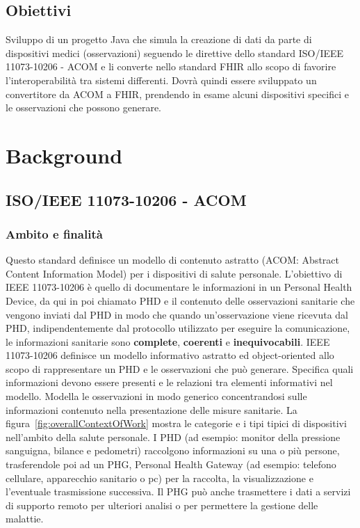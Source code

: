 \documentclass[a4paper]{article}
\begin{document}
\subsection{Obiettivi}
Sviluppo di un progetto Java che simula la creazione di dati da parte di dispositivi medici (osservazioni) seguendo le direttive dello standard ISO/IEEE 11073-10206 - ACOM e li converte nello
standard FHIR allo scopo di favorire l'interoperabilità tra sistemi differenti.
Dovrà quindi essere sviluppato un convertitore da ACOM a FHIR, prendendo in esame alcuni dispositivi specifici e le osservazioni che possono generare. 
\section{Background}
\subsection{ISO/IEEE 11073-10206 - ACOM}
\subsubsection{Ambito e finalità}
Questo standard definisce un modello di contenuto astratto (ACOM: Abstract Content Information Model) per i dispositivi di salute personale.
L'obiettivo di IEEE 11073-10206 è quello di documentare le informazioni in un Personal Health Device, da qui in poi chiamato PHD e il contenuto delle osservazioni sanitarie che vengono inviati dal PHD in modo che quando un'osservazione viene ricevuta dal PHD, indipendentemente dal protocollo utilizzato per eseguire
la comunicazione, le informazioni sanitarie sono \textbf{complete}, \textbf{coerenti} e \textbf{inequivocabili}.
IEEE 11073-10206 definisce un modello informativo astratto ed object-oriented allo scopo di rappresentare un PHD e le osservazioni che può generare.
Specifica quali informazioni devono essere presenti e le relazioni tra elementi informativi nel modello. Modella le osservazioni in modo generico
concentrandosi sulle informazioni contenuto nella presentazione delle misure sanitarie.
La figura~\ref{fig:overallContextOfWork} mostra le categorie e i tipi tipici di dispositivi nell'ambito della salute personale. I PHD (ad esempio: monitor della pressione sanguigna, bilance e pedometri) raccolgono informazioni su una o più persone, trasferendole poi ad un PHG, Personal Health Gateway (ad esempio: telefono cellulare, apparecchio sanitario o pc) per la raccolta, la visualizzazione e l'eventuale trasmissione successiva. Il PHG può anche trasmettere i dati a servizi di supporto remoto per ulteriori analisi o per permettere la gestione delle malattie.
\end{document}
